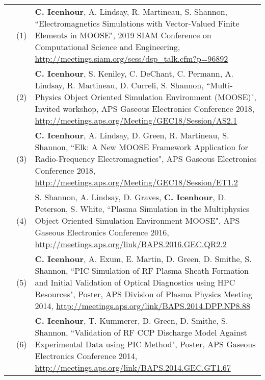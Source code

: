 \documentclass{article}
\begin{document}
	\begin{tabularx}{\textwidth}{l l X}
		\hspace{2em} 
			& (1)  & \textbf{C. Icenhour}, A. Lindsay, R. Martineau, S. Shannon, ``Electromagnetics Simulations with Vector-Valued Finite Elements in MOOSE", 2019 SIAM Conference on Computational Science and Engineering, \url{http://meetings.siam.org/sess/dsp_talk.cfm?p=96892} \\
			& (2)  & \textbf{C. Icenhour}, S. Keniley, C. DeChant, C. Permann, A. Lindsay, R. Martineau, D. Curreli, S. Shannon, ``Multi-Physics Object Oriented Simulation Environment (MOOSE)", Invited workshop, APS Gaseous Electronics Conference 2018, \url{http://meetings.aps.org/Meeting/GEC18/Session/AS2.1} \\
			& (3)  & \textbf{C. Icenhour}, A. Lindsay, D. Green, R. Martineau, S. Shannon, ``Elk: A New MOOSE Framework Application for Radio-Frequency Electromagnetics", APS Gaseous Electronics Conference 2018, \url{http://meetings.aps.org/Meeting/GEC18/Session/ET1.2} \\
			& (4)  &  S. Shannon, A. Lindsay, D. Graves, \textbf{C. Icenhour}, D. Peterson, S. White, ``Plasma Simulation in the Multiphysics Object Oriented Simulation Environment MOOSE", APS Gaseous Electronics Conference 2016, \newline \url{http://meetings.aps.org/link/BAPS.2016.GEC.QR2.2} \\
			& (5)  & \textbf{C. Icenhour}, A. Exum, E. Martin, D. Green, D. Smithe, S. Shannon, ``PIC Simulation of RF Plasma Sheath Formation and Initial Validation of Optical Diagnostics using HPC Resources", Poster, APS Division of Plasma Physics Meeting 2014, \url{http://meetings.aps.org/link/BAPS.2014.DPP.NP8.88} \\
			& (6)  & \textbf{C. Icenhour}, T. Kummerer, D. Green, D. Smithe, S. Shannon, ``Validation of RF CCP Discharge Model Against Experimental Data using PIC Method", Poster, APS Gaseous Electronics Conference 2014, \newline \url{http://meetings.aps.org/link/BAPS.2014.GEC.GT1.67}
	\end{tabularx}
\end{document}

